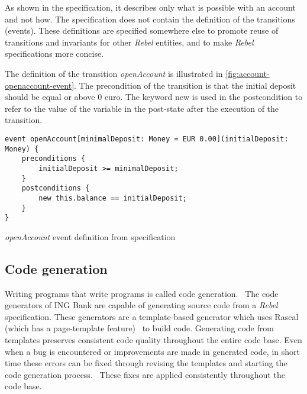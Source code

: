 As shown in the specification, it describes only what is possible with an
account and not how. The specification does not contain the definition of the
transitions (events). These definitions are specified somewhere else to promote reuse of
transitions and invariants for other \textit{Rebel} entities, and to make
\textit{Rebel} specifications more concise.~\cite[p.~4]{stoel_storm_vinju_bosman_2016}

The definition of the transition \textit{openAccount} is illustrated in
\autoref{fig:account-openaccount-event}. The precondition of the transition is
that the initial deposit should be equal or above 0 euro. The keyword new is
used in the postcondition to refer to the value of the variable in the
post-state after the execution of the transition.~\cite[p.~4]{stoel_storm_vinju_bosman_2016}

\begin{sourcecode}[h!]
\begin{lstlisting}[]
event openAccount[minimalDeposit: Money = EUR 0.00](initialDeposit: Money) {
	preconditions {
		initialDeposit >= minimalDeposit;
	}
	postconditions {
		new this.balance == initialDeposit;
	}
}
\end{lstlisting}
\caption{\textit{openAccount} event definition from specification}\label{fig:account-openaccount-event}
\end{sourcecode}
\FloatBarrier

\subsection{Code generation}\label{sec:ch2-codegen}

Writing programs that write programs is called code
generation.~\cite[p.~3]{herrington2003code} The code generators of ING Bank are
capable of generating source code from a \textit{Rebel} specification.
These generators are a template-based generator which uses Rascal (which has a
page-template feature)~\cite{RascalGTTSE} to build code.
Generating code from templates preserves consistent code quality throughout the
entire code base. Even when a bug is encountered or improvements are made in
generated code, in short time these errors can be fixed through revising the
templates and starting the code generation process.~\cite[p.~15-17]{herrington2003code}
These fixes are applied consistently throughout the code base.

